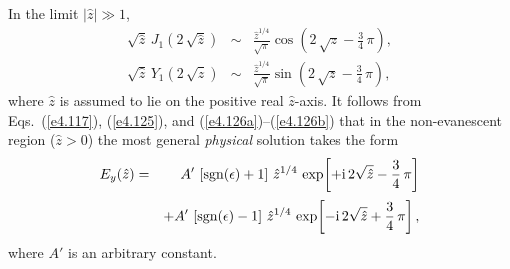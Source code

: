 In the limit $|\hat{z}|\gg 1$, 
\begin{eqnarray}\label{e4.126a}
\sqrt{\hat{z}}\,J_1(2\,\sqrt{\hat{z}})&\sim& \frac{\hat{z}^{1/4}}{\sqrt{\pi}}\cos\!\left(2\,
\sqrt{z}
-\frac{3}{4}\,\pi\right),\\[0.5ex]
\sqrt{\hat{z}}\,Y_1(2\,\sqrt{\hat{z}})&\sim & \frac{\hat{z}^{1/4}}{\sqrt{\pi}}\sin\!\left(2\,
\sqrt{z}
-\frac{3}{4}\,\pi\right),\label{e4.126b}
\end{eqnarray}
where $\hat{z}$ is assumed to lie on the positive real $\hat{z}$-axis. 
It follows from Eqs.~(\ref{e4.117}), (\ref{e4.125}), and (\ref{e4.126a})--(\ref{e4.126b}) that in the
non-evanescent region ($\hat{z}> 0$) the most general
{\em physical} solution takes the form
\begin{eqnarray}
E_y(\hat{z})& =& A'\,\left[{\rm sgn}(\epsilon) + 1\right]\,\hat{z}^{1/4}\,
\exp\!\left[
+{\rm i}\,2\sqrt{\hat{z}} - \frac{3}{4}\,\pi\right]\nonumber\\[0.5ex]
&&+A'\,
\left[{\rm sgn}(\epsilon) - 1\right]\,\hat{z}^{1/4}\,\exp\!\left[
-{\rm i}\,2\sqrt{\hat{z}} + \frac{3}{4}\,\pi\right],\label{e4.127}
\end{eqnarray}
where $A'$ is an arbitrary constant.

